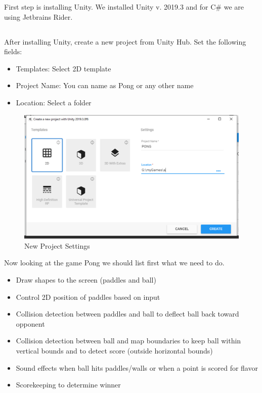 \documentclass[
]{book}
\providecommand{\tightlist}{%
  \setlength{\itemsep}{0pt}\setlength{\parskip}{0pt}}
\begin{document}
First step is installing Unity. We installed Unity v. 2019.3 and for C\# we are using Jetbrains Rider.

\hypertarget{section}{%
\subsection{}\label{section}}

After installing Unity, create a new project from Unity Hub. Set the following fields:

\begin{itemize}
\tightlist
\item
  Templates: Select 2D template\\
\item
  Project Name: You can name as Pong or any other name\\
\item
  Location: Select a folder
\end{itemize}

\begin{figure}
\centering
\includegraphics{Images/newproject.png}
\caption{New Project Settings}
\end{figure}

Now looking at the game Pong we should list first what we need to do.

\begin{itemize}
\tightlist
\item
  Draw shapes to the screen (paddles and ball)
\item
  Control 2D position of paddles based on input
\item
  Collision detection between paddles and ball to deflect ball back toward opponent
\item
  Collision detection between ball and map boundaries to keep ball within vertical bounds and to detect score (outside horizontal bounds)
\item
  Sound effects when ball hits paddles/walls or when a point is scored for flavor
\item
  Scorekeeping to determine winner
\end{itemize}
\end{document}

